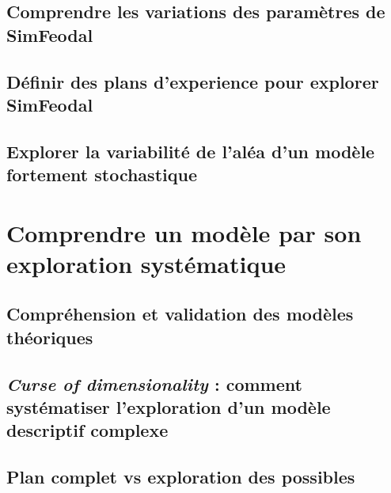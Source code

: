 \subsection{Comprendre les variations des paramètres de SimFeodal}
\subsection{Définir des plans d'experience pour explorer SimFeodal}
\subsection{Explorer la variabilité de l'aléa d'un modèle fortement stochastique}

\section{Comprendre un modèle par son exploration systématique}
\subsection{Compréhension et validation des modèles théoriques}
\subsection{\textit{Curse of dimensionality} : comment systématiser l'exploration d'un modèle descriptif complexe}
\subsection{Plan complet vs exploration des possibles}